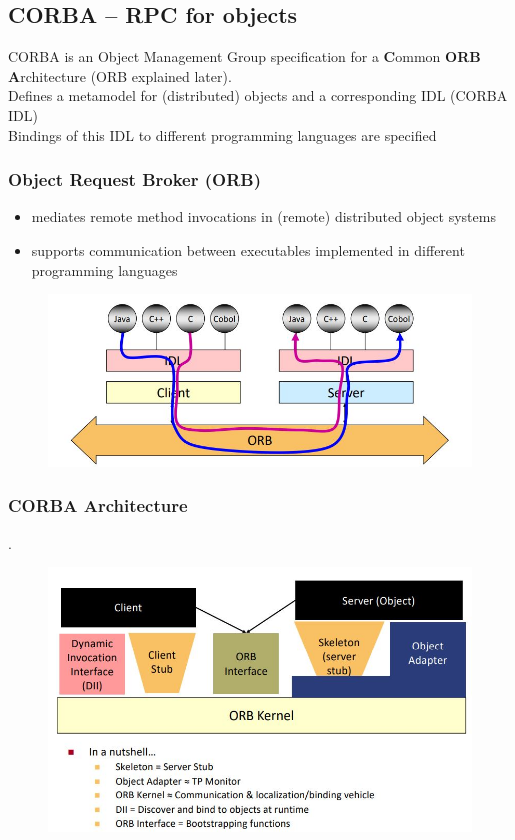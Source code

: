 		\subsection{CORBA -- RPC for objects}
			CORBA is an Object Management Group specification for a	\textbf{C}ommon \textbf{ORB} \textbf{A}rchitecture (ORB explained later).\\
			Defines a metamodel for (distributed) objects and a corresponding IDL (CORBA IDL)\\
			Bindings of this IDL to different programming languages are	specified
			
			\subsubsection{Object Request Broker (ORB)}
			\begin{itemize}
				\item mediates remote method invocations in (remote) distributed object systems
				\item supports communication between executables implemented in different programming languages
			\end{itemize}
			\begin{figure}[h!]
				\includegraphics[scale=0.7]{res/orb.jpg}
			\end{figure}
		
		
			\subsubsection{CORBA Architecture}.
				\begin{figure}[h!]
					\includegraphics[scale=0.6]{res/corba-arch.jpg}
				\end{figure}
			
